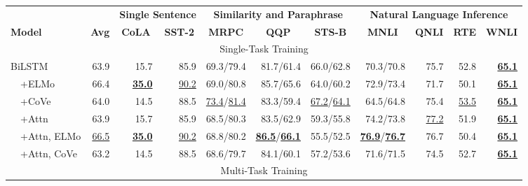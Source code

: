 \begin{table*}[t]
\centering \fontsize{8.4}{10.1}\selectfont \setlength{\tabcolsep}{0.5em}
\begin{tabular}{lrrrrrrrrrr}

\toprule

&& \multicolumn{2}{c}{\textbf{Single Sentence}} & \multicolumn{3}{c}{\textbf{Similarity and Paraphrase}} & \multicolumn{4}{c}{\textbf{Natural Language Inference}} \\
\textbf{Model} & \multicolumn{1}{c}{\textbf{Avg}} & \multicolumn{1}{c}{\textbf{CoLA}} & \multicolumn{1}{c}{\textbf{SST-2}} & \multicolumn{1}{c}{\textbf{MRPC}} & \multicolumn{1}{c}{\textbf{QQP}} & \multicolumn{1}{c}{\textbf{STS-B}} & \multicolumn{1}{c}{\textbf{MNLI}} & \multicolumn{1}{c}{\textbf{QNLI}} & \multicolumn{1}{c}{\textbf{RTE}} & \multicolumn{1}{c}{\textbf{WNLI}} \\
\midrule
\multicolumn{11}{c}{Single-Task Training} \\
\midrule

BiLSTM & 63.9 & 15.7 & 85.9 & 69.3/79.4 & 81.7/61.4 & 66.0/62.8 & 70.3/70.8 & 75.7 & 52.8 & \textbf{\underline{65.1}} \\

~~+ELMo & 66.4 & \textbf{\underline{35.0}} & \underline{90.2} & 69.0/80.8 & 85.7/65.6 & 64.0/60.2 & 72.9/73.4 & 71.7 & 50.1 & \textbf{\underline{65.1}} \\

~~+CoVe & 64.0 & 14.5 & 88.5 & \underline{73.4}/\underline{81.4} & 83.3/59.4 & \underline{67.2}/\underline{64.1} & 64.5/64.8 & 75.4 & \underline{53.5} & \textbf{\underline{65.1}} \\

~~+Attn & 63.9 & 15.7 & 85.9 & 68.5/80.3 & 83.5/62.9 & 59.3/55.8 & 74.2/73.8 & \underline{77.2} & 51.9 & \textbf{\underline{65.1}} \\

~~+Attn, ELMo & \underline{66.5} & \textbf{\underline{35.0}} & \underline{90.2} & 68.8/80.2 & \textbf{\underline{86.5}}/\textbf{\underline{66.1}} & 55.5/52.5 & \textbf{\underline{76.9}}/\textbf{\underline{76.7}} & 76.7 & 50.4 & \textbf{\underline{65.1}} \\

~~+Attn, CoVe & 63.2 & 14.5 & 88.5 & 68.6/79.7 & 84.1/60.1 & 57.2/53.6 & 71.6/71.5 & 74.5 & 52.7 & \textbf{\underline{65.1}} \\

\midrule
\multicolumn{11}{c}{Multi-Task Training} \\
\midrule


\end{tabular}
\end{table*}
